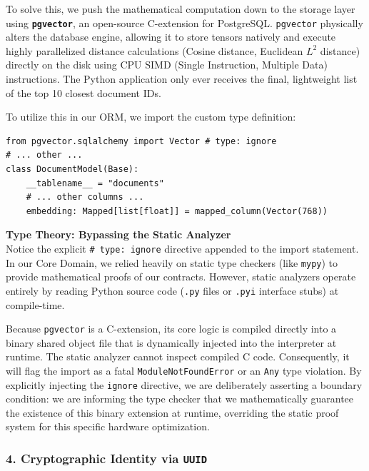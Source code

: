 To solve this, we push the mathematical computation down to the storage layer using \textbf{\texttt{pgvector}}, an open-source C-extension for PostgreSQL. \texttt{pgvector} physically alters the database engine, allowing it to store tensors natively and execute highly parallelized distance calculations (Cosine distance, Euclidean $L^2$ distance) directly on the disk using CPU SIMD (Single Instruction, Multiple Data) instructions. The Python application only ever receives the final, lightweight list of the top 10 closest document IDs.

To utilize this in our ORM, we import the custom type definition:

\begin{lstlisting}[caption={Mapping the Vector Type}]
from pgvector.sqlalchemy import Vector # type: ignore
# ... other ...
class DocumentModel(Base):
    __tablename__ = "documents"
    # ... other columns ...
    embedding: Mapped[list[float]] = mapped_column(Vector(768))
\end{lstlisting}

\textbf{Type Theory: Bypassing the Static Analyzer} \\
Notice the explicit \texttt{\# type: ignore} directive appended to the import statement. In our Core Domain, we relied heavily on static type checkers (like \texttt{mypy}) to provide mathematical proofs of our contracts. However, static analyzers operate entirely by reading Python source code (\texttt{.py} files or \texttt{.pyi} interface stubs) at compile-time.

Because \texttt{pgvector} is a C-extension, its core logic is compiled directly into a binary shared object file %
that is dynamically injected into the interpreter at runtime. The static analyzer cannot inspect compiled C code. Consequently, it will flag the import as a fatal \texttt{ModuleNotFoundError} or an \texttt{Any} type violation. By explicitly injecting the \texttt{ignore} directive, we are deliberately asserting a boundary condition: we are informing the type checker that we mathematically guarantee the existence of this binary extension at runtime, overriding the static proof system for this specific hardware optimization.

\subsubsection*{4. Cryptographic Identity via \texttt{UUID}}

